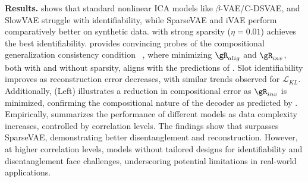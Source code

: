 \documentclass{article} %
\theoremstyle{plain}
\theoremstyle{definition}
\theoremstyle{remark}
\numberwithin{equation}{section}
\begin{document}


\textbf{Results.}  shows that standard nonlinear ICA models like $\beta$-VAE/C-DSVAE, and SlowVAE struggle with identifiability, while SparseVAE and iVAE perform comparatively better on synthetic data. \TimeCSL with strong sparsity ($\eta=0.01$) achieves the best identifiability.  provides convincing probes of the compositional generalization consistency condition~ , where minimizing $\gR_{alig}$ and $\gR_{inv}$, both with and without sparsity, aligns with the predictions of . Slot identifiability improves as reconstruction error decreases, with similar trends observed for $\mathcal{L}_{KL}$. Additionally,  (Left) illustrates a reduction in compositional error as $\gR_{inv}$ is minimized, confirming the compositional nature of the decoder as predicted by . Empirically,  summarizes the performance of different models as data complexity increases, controlled by correlation levels. The findings show that \TimeCSL surpasses SparseVAE, demonstrating better disentanglement and reconstruction. However, at higher correlation levels, models without tailored designs for identifiability and disentanglement face challenges, underscoring potential limitations in real-world applications.\par
\end{document}
